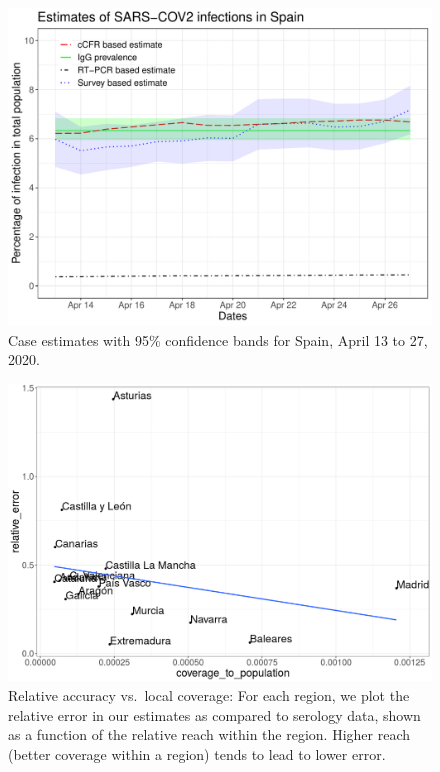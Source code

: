 \documentclass{article}
\newcommand{\hh}[1]{{#1}}
\begin{document}
\begin{figure}[htb]
\begin{center}
\includegraphics[width=0.9\linewidth]{Callibration_2_CIs.pdf}
\end{center}
\caption{\hh{Case estimates with 95\% confidence bands for Spain, April 13 to 27, 2020.}}
\label{cal}
\end{figure}

\begin{figure}[htb]
\begin{center}
\includegraphics[width=1.0\linewidth]{fig2largerfont.png} %
\end{center}
\caption{Relative accuracy vs.~local coverage: For each region, we plot the relative error in our estimates as compared to serology data, shown as a function of the relative reach within the region. Higher reach (better coverage within a region) tends to lead to lower error. }
\label{fig:coverage-vs-accuracy}
\end{figure}
\end{document}
